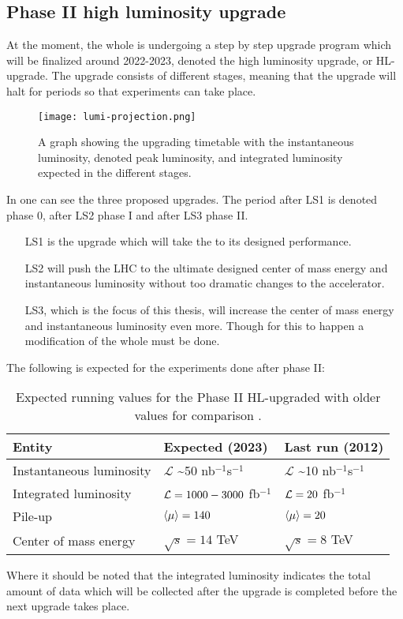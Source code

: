 \subsection{Phase II high luminosity upgrade}\label{sec:eo:subsec:hlu}
At the moment, the whole \abbrLHC is undergoing a step by step upgrade program which will be finalized around 2022-2023, denoted the high luminosity upgrade, or HL-upgrade. The upgrade consists of different stages, meaning that the upgrade will halt for periods so that experiments can take place. 
\begin{figure}[ht]
\texttt{[image: lumi-projection.png]}
\caption{A graph showing the upgrading timetable with the instantaneous luminosity, denoted peak luminosity, and integrated luminosity expected in the different stages.}
\label{fig:upgt}
\end{figure}
In  one can see the three proposed upgrades. The period after LS1 is denoted phase 0, after LS2 phase I and after LS3 phase II. 
\begin{itemize}
\item[LS1] is the upgrade which will take the \abbrLHC to its designed performance. 

\item[LS2] will push the LHC to the ultimate designed center of mass energy and instantaneous luminosity without too dramatic changes to the accelerator. 
\item[LS3,] which is the focus of this thesis, will increase the center of mass energy and instantaneous luminosity even more. Though for this to happen a modification of the whole \abbrLHC must be done.
\end{itemize}
The following is expected for the experiments done after phase II:
\renewcommand{\arraystretch}{1.5} %
\begin{table}[H]
\begin{center}
    \begin{tabular}{ | l | l | l |}
    \hline
    Entity & Expected (2023) & Last run (2012) \\ \hline
    Instantaneous luminosity & $\mathscr{L}$ \textasciitilde 50 nb$^{-1}$s$^{-1}$ & $\mathscr{L}$ \textasciitilde 10 nb$^{-1}$s$^{-1}$ \\ \hline  
    Integrated luminosity & $\mathcal{L}=1000-3000$ fb$^{-1}$ & $\mathcal{L}=20$ fb$^{-1}$ \\ \hline
  	Pile-up & $\left<\mu\right>=140$ & $\left<\mu\right>=20$ \\ \hline
  	Center of mass energy & $\sqrt{s}=14$ TeV &  $\sqrt{s}=8$ TeV \\ \hline
  	\end{tabular}
  	
  	\caption{Expected running values for the Phase II HL-upgraded \abbrLHC with older values for comparison \citep{HL:2013}.}
  	\label{tab:expectvalues}
  	\end{center}
    \end{table}
    \renewcommand{\arraystretch}{1.0}  %
Where it should be noted that the integrated luminosity indicates the total amount of data which will be collected after the upgrade is completed before the next upgrade takes place. 

